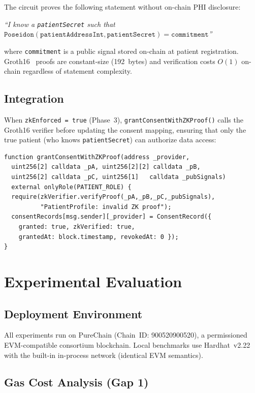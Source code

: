 \documentclass[journal]{IEEEtran}
\begin{document}
The circuit proves the following statement without on-chain PHI disclosure:

\textit{``I know a \texttt{patientSecret} such that
$\mathtt{Poseidon(patientAddressInt, patientSecret) = commitment}$''}

where \texttt{commitment} is a public signal stored on-chain at patient
registration. Groth16~\cite{groth16} proofs are constant-size (192~bytes)
and verification costs $O(1)$ on-chain regardless of statement complexity.

\subsection{Integration}

When \texttt{zkEnforced = true} (Phase~3), \texttt{grantConsentWithZKProof()}
calls the Groth16 verifier before updating the consent mapping, ensuring
that only the true patient (who knows \texttt{patientSecret}) can authorize
data access:

\begin{lstlisting}[language=Solidity,caption=ZK Consent Gate (Gap 3)]
function grantConsentWithZKProof(address _provider,
  uint256[2] calldata _pA, uint256[2][2] calldata _pB,
  uint256[2] calldata _pC, uint256[1]   calldata _pubSignals)
  external onlyRole(PATIENT_ROLE) {
  require(zkVerifier.verifyProof(_pA,_pB,_pC,_pubSignals),
          "PatientProfile: invalid ZK proof");
  consentRecords[msg.sender][_provider] = ConsentRecord({
    granted: true, zkVerified: true,
    grantedAt: block.timestamp, revokedAt: 0 });
}
\end{lstlisting}

\section{Experimental Evaluation}
\label{sec:eval}

\subsection{Deployment Environment}

All experiments run on PureChain (Chain~ID: 900520900520), a permissioned
EVM-compatible consortium blockchain. Local benchmarks use Hardhat~v2.22
with the built-in in-process network (identical EVM semantics).

\subsection{Gas Cost Analysis (Gap 1)}
\end{document}
